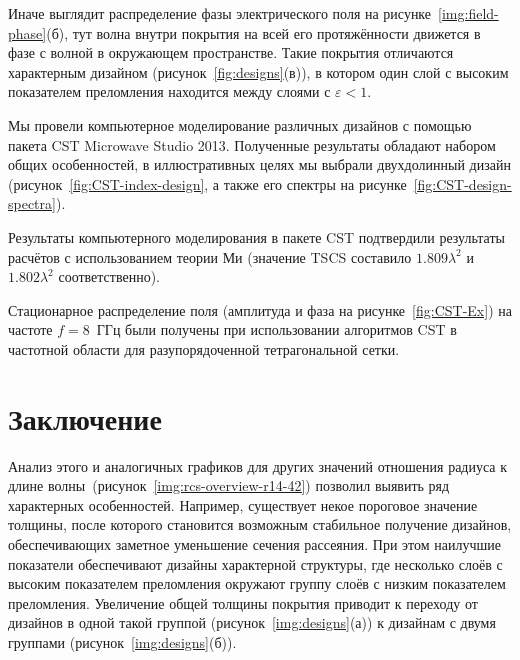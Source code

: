 Иначе выглядит распределение фазы электрического поля на
рисунке~\ref{img:field-phase}(б), тут волна внутри покрытия на всей его
протяжённости движется в фазе с волной в окружающем пространстве.  Такие покрытия отличаются характерным дизайном
(рисунок~\ref{fig:designs}(в)), в котором один слой с высоким
показателем преломления находится между слоями с ${\varepsilon<1}$.

Мы провели компьютерное моделирование различных дизайнов с помощью
пакета CST Microwave Studio 2013.  Полученные результаты обладают
набором общих особенностей, в иллюстративных целях мы выбрали
двухдолинный дизайн (рисунок~\ref{fig:CST-index-design}, а также его
спектры на рисунке~\ref{fig:CST-design-spectra}).

Результаты компьютерного моделирования в пакете CST подтвердили
результаты расчётов с использованием теории Ми (значение TSCS
составило $1.809\lambda^2$ и $1.802\lambda^2$ соответственно).

Стационарное распределение поля (амплитуда  и фаза на
рисунке~\ref{fig:CST-Ex}) на частоте ${f = 8}$~ГГц были получены при
использовании алгоритмов CST в частотной области для разупорядоченной
тетрагональной сетки.



\section{Заключение}
Анализ этого и аналогичных графиков для других значений отношения
радиуса к длине волны~(рисунок~\ref{img:rcs-overview-r14-42}) позволил
выявить ряд характерных особенностей. Например, существует некое
пороговое значение толщины, после которого становится возможным
стабильное получение дизайнов, обеспечивающих заметное уменьшение
сечения рассеяния. При этом наилучшие показатели обеспечивают дизайны
характерной структуры, где несколько слоёв с высоким показателем
преломления окружают группу слоёв с низким показателем
преломления. Увеличение общей толщины покрытия приводит к переходу от
дизайнов в одной такой группой (рисунок~\ref{img:designs}(а)) к
дизайнам с двумя группами (рисунок~\ref{img:designs}(б)).




